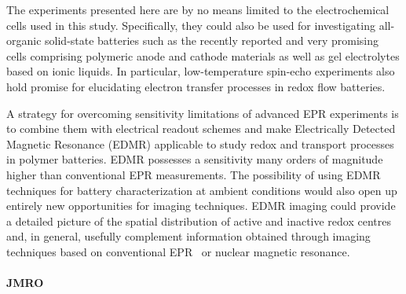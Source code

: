 \par
The experiments presented here are by no means limited to the electrochemical cells used in this study. Specifically, they could also be used for investigating all-organic solid-state batteries such as the recently reported and very promising cells comprising polymeric anode and cathode materials as well as gel electrolytes based on ionic liquids.\cite{muench2021_jps} In particular, low-temperature spin-echo experiments also hold promise for elucidating electron transfer processes in redox flow batteries.\cite{zhao2021_jacs}

\par
A strategy for overcoming sensitivity limitations of advanced EPR experiments is to combine them with electrical readout schemes and make Electrically Detected Magnetic Resonance (EDMR) applicable to study redox and transport processes in polymer batteries. EDMR possesses a sensitivity many orders of magnitude higher than conventional EPR measurements.\cite{mccamey2006_apl} The possibility of using EDMR techniques for battery characterization at ambient conditions would also open up entirely new opportunities for imaging techniques. EDMR imaging could provide a detailed picture of the spatial distribution of active and inactive redox centres and, in general, usefully complement information obtained through imaging techniques based on conventional EPR~\cite{sathiya2015_natcomm, dutoit2021_natcomm, geng2021_chemofmat} or nuclear magnetic resonance.\cite{ilott2016_pnas}\par



\paragraph{JMRO}




